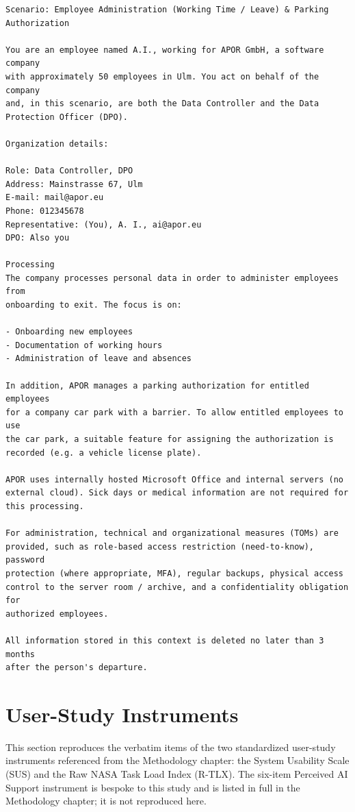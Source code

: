 \begin{verbatim}
Scenario: Employee Administration (Working Time / Leave) & Parking
Authorization

You are an employee named A.I., working for APOR GmbH, a software company
with approximately 50 employees in Ulm. You act on behalf of the company
and, in this scenario, are both the Data Controller and the Data
Protection Officer (DPO).

Organization details:

Role: Data Controller, DPO
Address: Mainstrasse 67, Ulm
E-mail: mail@apor.eu
Phone: 012345678
Representative: (You), A. I., ai@apor.eu
DPO: Also you

Processing
The company processes personal data in order to administer employees from
onboarding to exit. The focus is on:

- Onboarding new employees
- Documentation of working hours
- Administration of leave and absences

In addition, APOR manages a parking authorization for entitled employees
for a company car park with a barrier. To allow entitled employees to use
the car park, a suitable feature for assigning the authorization is
recorded (e.g. a vehicle license plate).

APOR uses internally hosted Microsoft Office and internal servers (no
external cloud). Sick days or medical information are not required for
this processing.

For administration, technical and organizational measures (TOMs) are
provided, such as role-based access restriction (need-to-know), password
protection (where appropriate, MFA), regular backups, physical access
control to the server room / archive, and a confidentiality obligation for
authorized employees.

All information stored in this context is deleted no later than 3 months
after the person's departure.
\end{verbatim}


\section{User-Study Instruments}
\label{app:sus-rtlx-items}

This section reproduces the verbatim items of the two standardized
user-study instruments referenced from the Methodology chapter:
the System Usability Scale (SUS) and the Raw NASA Task Load Index
(R-TLX). The six-item Perceived AI Support instrument is bespoke
to this study and is listed in full in the Methodology chapter;
it is not reproduced here.


